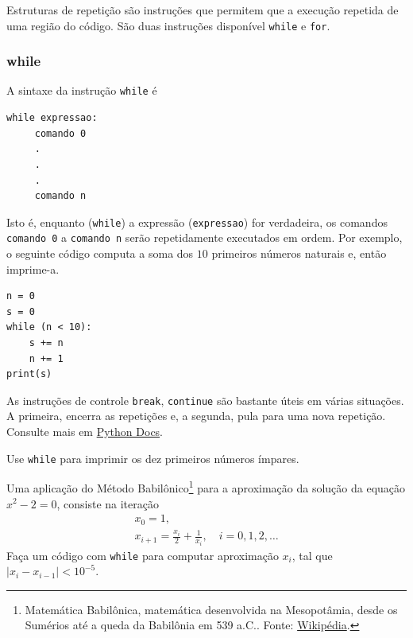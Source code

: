\documentclass[12pt]{article}
\begin{document}
Estruturas de repetição são instruções que permitem que a execução repetida de uma região do código. São duas instruções disponível \lstinline+while+ e \lstinline+for+.

\subsubsection{while}

A sintaxe da instrução \lstinline+while+ é
\begin{lstlisting}
while expressao:
     comando 0
     .
     .
     .
     comando n
\end{lstlisting}
Isto é, enquanto (\lstinline+while+) a expressão (\lstinline+expressao+) for verdadeira, os comandos \lstinline+comando 0+ a \lstinline+comando n+ serão repetidamente executados em ordem. Por exemplo, o seguinte código computa a soma dos $10$ primeiros números naturais e, então imprime-a.
\begin{lstlisting}
n = 0
s = 0
while (n < 10):
    s += n
    n += 1
print(s)
\end{lstlisting}

\begin{obs}
  As instruções de controle \lstinline+break+, \lstinline+continue+ são bastante úteis em várias situações. A primeira, encerra as repetições e, a segunda, pula para uma nova repetição. Consulte mais em \href{https://docs.python.org/3/tutorial/controlflow.html\#break-and-continue-statements-and-else-clauses-on-loops}{Python Docs}.
\end{obs}

\begin{exr}
  Use \lstinline+while+ para imprimir os dez primeiros números ímpares.
\end{exr}

\begin{exr}
  Uma aplicação do Método Babilônico\footnote{Matemática Babilônica, matemática desenvolvida na Mesopotâmia, desde os Sumérios até a queda da Babilônia em 539 a.C.. Fonte: \href{https://pt.wikipedia.org/wiki/Matem\%C3\%A1tica\_babil\%C3\%B4nica}{Wikipédia}.} para a aproximação da solução da equação $x^2-2 = 0$, consiste na iteração
  \begin{gather}
    x_0 = 1,\\
    x_{i+1} = \frac{x_i}{2} + \frac{1}{x_i},\quad i=0,1,2,\ldots
  \end{gather}
  Faça um código com \lstinline+while+ para computar aproximação $x_{i}$, tal que $|x_{i}-x_{i-1}|<10^{-5}$.
\end{exr}
\end{document}
